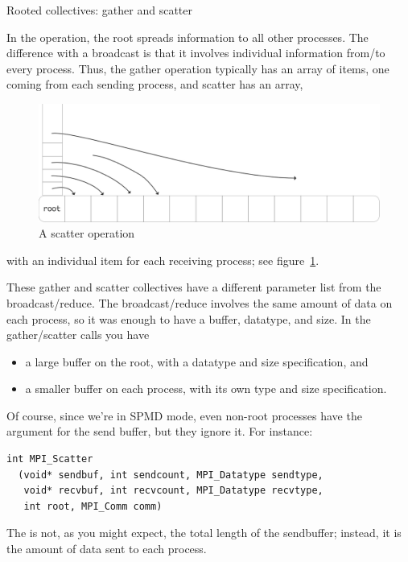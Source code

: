 
 {Rooted collectives: gather and scatter}
\label{sec:gatherscatter}

In the  operation, the root spreads information to
all other processes. The difference with a broadcast is that it involves
individual information from/to every process. Thus, the gather operation typically 
has an array of items, one coming from each sending process, and scatter has an array,
\begin{figure}[ht]
  \includegraphics[scale=.12]{graphics/scatter-simple}
  \caption{A scatter operation}
  \label{fig:scatter}
\end{figure}
with an individual item for each receiving process; see figure~\ref{fig:scatter}.

These gather and scatter collectives have a different parameter list from
the broadcast/reduce. The broadcast/reduce involves the same amount
of data on each process, so it was enough to have a buffer, datatype, and size.
In the gather/scatter calls you have
\begin{itemize}
\item a large buffer on the root, with a datatype and size specification, and
\item a smaller buffer on each process, with its own type and size specification.
\end{itemize}
Of course, since we're in SPMD mode, even non-root processes have
the argument for the send buffer, but they ignore it. For instance:
\begin{verbatim}
int MPI_Scatter
  (void* sendbuf, int sendcount, MPI_Datatype sendtype, 
   void* recvbuf, int recvcount, MPI_Datatype recvtype, 
   int root, MPI_Comm comm) 
\end{verbatim}
The  is not, as you might expect, the total length of the
sendbuffer; instead, it is the amount of data sent to each process.

